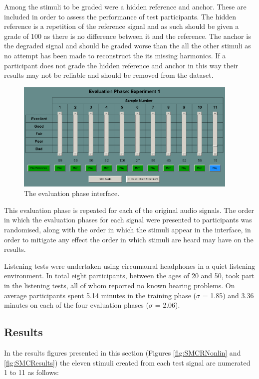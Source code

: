 			Among the stimuli to be graded were a hidden reference and anchor. These are included in order to
			assess the performance of test participants. The hidden reference is a repetition of the reference
			signal and as such should be given a grade of 100 as there is no difference between it and the
			reference. The anchor is the degraded signal and should be graded worse than the all the other
			stimuli as no attempt has been made to reconstruct the its missing harmonics. If a participant does
			not grade the hidden reference and anchor in this way their results may not be reliable and should
			be removed from the dataset.

			\begin{figure}[h!]
				\centering
				\includegraphics[width=0.95\textwidth]{chapter7/Images/MushraEvaluation.png}
				\caption{The evaluation phase interface.}
				\label{fig:MushraEvaluation}
			\end{figure}

			This evaluation phase is repeated for each of the original audio signals. The order in which the
			evaluation phases for each signal were presented to participants was randomised, along with the
			order in which the stimuli appear in the interface, in order to mitigate any effect the order in
			which stimuli are heard may have on the results.

			Listening tests were undertaken using circumaural headphones in a quiet listening environment. In
			total eight participants, between the ages of 20 and 50, took part in the listening tests, all of
			whom reported no known hearing problems. On average participants spent 5.14 minutes in the training
			phase ($\sigma$ = 1.85) and 3.36 minutes on each of the four evaluation phases ($\sigma$ = 2.06).

	\subsection{Results}
	\label{sec:PerceptualExperiments-Reconstruction-Results}
		In the results figures presented in this section (Figures \ref{fig:SMCRNonlin} and \ref{fig:SMCResults})
		the eleven stimuli created from each test signal are numerated 1 to 11 as follows:

